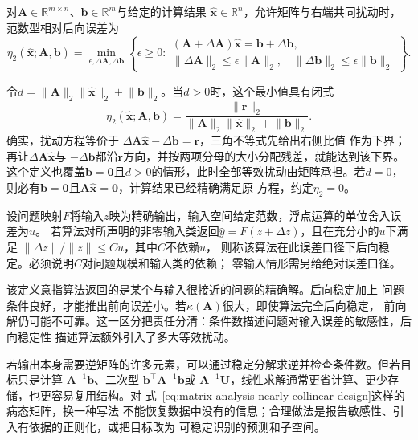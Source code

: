 \begin{definition}[线性系统的范数型相对后向误差]
\label{def:matrix-analysis-normwise-backward-error}
对$\bm{A}\in\mathbb{R}^{m\times n}$、$\bm b\in\mathbb R^m$与给定的计算结果
$\widehat{\bm x}\in\mathbb R^n$，允许矩阵与右端共同扰动时，范数型相对后向误差为
\[
  \eta_2(\widehat{\bm{x}};\bm{A},\bm{b})
  =
  \min_{\epsilon,\Delta\bm{A},\Delta\bm{b}}
  \left\{
    \epsilon\geq0:
    \begin{array}{l}
      (\bm{A}+\Delta\bm{A})\widehat{\bm{x}}
      =\bm{b}+\Delta\bm{b},\\
      \lVert\Delta\bm{A}\rVert_2\leq\epsilon\lVert\bm{A}\rVert_2,\quad
      \lVert\Delta\bm{b}\rVert_2\leq\epsilon\lVert\bm{b}\rVert_2
    \end{array}
  \right\}.
\]
\end{definition}
令$d=\lVert\bm{A}\rVert_2\lVert\widehat{\bm{x}}\rVert_2
+\lVert\bm{b}\rVert_2$。当$d>0$时，这个最小值具有闭式
\[
  \eta_2(\widehat{\bm{x}};\bm{A},\bm{b})
  =
  \frac{\lVert\bm{r}\rVert_2}
       {\lVert\bm{A}\rVert_2\lVert\widehat{\bm{x}}\rVert_2
        +\lVert\bm{b}\rVert_2}.
\]
确实，扰动方程等价于
$\Delta\bm{A}\widehat{\bm{x}}-\Delta\bm{b}=\bm{r}$，三角不等式先给出右侧比值
作为下界；再让$\Delta\bm{A}\widehat{\bm{x}}$与
$-\Delta\bm{b}$都沿$\bm{r}$方向，并按两项分母的大小分配残差，就能达到该下界。
这个定义也覆盖$\bm{b}=\bm{0}$且$d>0$的情形，此时全部等效扰动由矩阵承担。若$d=0$，
则必有$\bm{b}=\bm{0}$且$\bm{A}\widehat{\bm{x}}=\bm{0}$，计算结果已经精确满足原
方程，约定$\eta_2=0$。

\begin{definition}[范数意义下的后向稳定]
\label{def:matrix-analysis-backward-stability}
设问题映射$F$将输入$z$映为精确输出，输入空间给定范数，浮点运算的单位舍入误差为$u$。
若算法对所声明的非零输入类返回$\widehat y=F(z+\Delta z)$，且在充分小的$u$下满足
$\lVert\Delta z\rVert/\lVert z\rVert\leq C u$，其中$C$不依赖$u$，
则称该算法在此误差口径下后向稳定。必须说明$C$对问题规模和输入类的依赖；
零输入情形需另给绝对误差口径。
\end{definition}
该定义意指算法返回的是某个与输入很接近的问题的精确解。后向稳定加上
问题条件良好，才能推出前向误差小。若$\kappa(\bm{A})$很大，即使算法完全后向稳定，
前向解仍可能不可靠。这一区分把责任分清：条件数描述问题对输入误差的敏感性，后向稳定性
描述算法额外引入了多大等效扰动。

若输出本身需要逆矩阵的许多元素，可以通过稳定分解求逆并检查条件数。但若目标只是计算
$\bm{A}^{-1}\bm{b}$、二次型
$\bm{b}^{\top}\bm{A}^{-1}\bm{b}$或
$\bm{A}^{-1}\bm{U}$，线性求解通常更省计算、更少存储，也更容易复用结构。对
式~\eqref{eq:matrix-analysis-nearly-collinear-design}这样的病态矩阵，换一种写法
不能恢复数据中没有的信息；合理做法是报告敏感性、引入有依据的正则化，或把目标改为
可稳定识别的预测和子空间。

